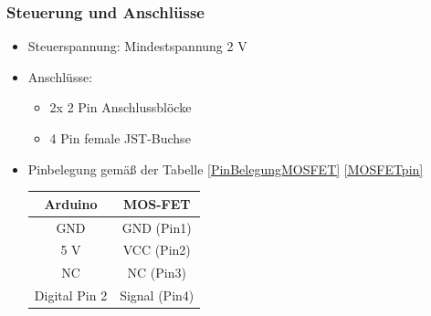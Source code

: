 \subsubsection{Steuerung und Anschlüsse \cite{ReicheltMOS:2025}}
\begin{itemize}
	\item Steuerspannung: Mindestspannung 2 V
	\item Anschlüsse:
	\begin{itemize}
		\item 2x 2 Pin Anschlussblöcke
		\item 4 Pin female JST-Buchse
	\end{itemize}
	\item Pinbelegung gemäß der Tabelle \ref{PinBelegungMOSFET} \ref{MOSFETpin}
	
	\begin{center}
		\begin{tabular}{c|c}
			Arduino & MOS-FET\\ \hline
			GND & GND (Pin1)\\
			5 V & VCC (Pin2)\\
			NC & NC (Pin3)\\
			Digital Pin 2 & Signal (Pin4)\\
		\end{tabular}
		\label{PinBelegungMOSFET}
	\end{center}
\end{itemize}
